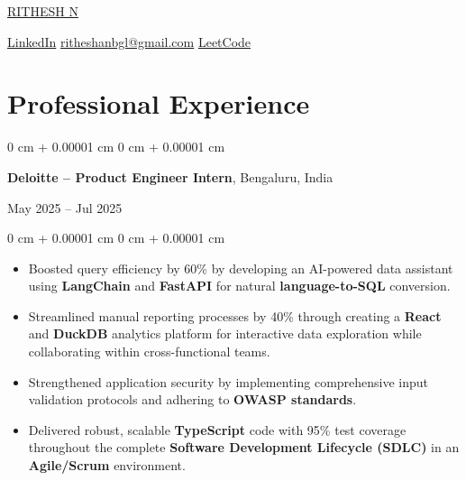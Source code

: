 \documentclass[10pt, letterpaper]{article}
\newenvironment{highlights}{
    \begin{itemize}[
        topsep=0.10 cm,
        parsep=0.10 cm,
        partopsep=0pt,
        itemsep=0pt,
        leftmargin=0 cm + 10pt
    ]
}{
    \end{itemize}
} %
\newenvironment{onecolentry}{
    \begin{adjustwidth}{
        0 cm + 0.00001 cm
    }{
        0 cm + 0.00001 cm
    }
}{
    \end{adjustwidth}
} %
\newenvironment{twocolentry}[2][]{
    \onecolentry
    \def\secondColumn{#2}
    \setcolumnwidth{\fill, 4.5 cm}
    \begin{paracol}{2}
}{
    \switchcolumn \raggedleft \secondColumn
    \end{paracol}
    \endonecolentry
} %
\newenvironment{header}{
    \setlength{\topsep}{0pt}\par\kern\topsep\centering\linespread{1.5}
}{
    \par\kern\topsep
} %
\begin{document}
\begin{header}

    \fontsize{30}{36}\selectfont
\href{https://rithesh.engineer/}{{RITHESH N}}

    \vspace{5 pt}

    \normalsize
    \mbox{\raisebox{-0.1\height}{\Large \faLinkedin}\hspace{3pt}\href{https://www.linkedin.com/in/ritheshan/}{\textcolor{blueHighlight}{\large LinkedIn}}} \hspace{12pt}%
\mbox{\raisebox{-0.15\height}{\Large \faEnvelope}\hspace{3pt}\href{mailto:ritheshanbgl@gmail.com}{\textcolor{blueHighlight}{\large ritheshanbgl@gmail.com}}} \hspace{8pt}%
\mbox{\hspace{3pt}\href{https://leetcode.com/rithesh_n}{\textcolor{blueHighlight}{\large LeetCode}}}%
\end{header}

    \vspace{10 pt  }

    \section{Professional Experience}

       \begin{twocolentry}{
    May 2025 – Jul 2025
}
    \textbf{\textcolor{blueHighlight}{\large Deloitte} – Product Engineer Intern}, Bengaluru, India
\end{twocolentry}

\vspace{0.10 cm}
\begin{onecolentry}
    \begin{highlights}
        \item Boosted query efficiency by 60\% by developing an AI-powered data assistant using \textbf{LangChain} and \textbf{FastAPI} for natural \textbf{language-to-SQL} conversion.
        \item Streamlined manual reporting processes by 40\% through creating a \textbf{React} and \textbf{DuckDB} analytics platform for interactive data exploration while collaborating within cross-functional teams.
        \item Strengthened application security by implementing comprehensive input validation protocols and adhering to \textbf{OWASP standards}.
        \item Delivered robust, scalable \textbf{TypeScript} code with 95\% test coverage throughout the complete \textbf{Software Development Lifecycle (SDLC)} in an \textbf{Agile/Scrum} environment.
    \end{highlights}
\end{onecolentry}
\end{document}
